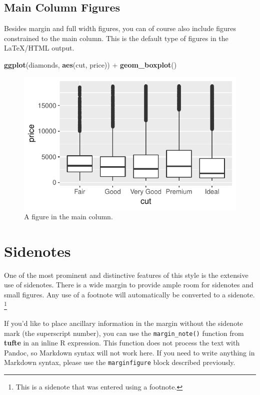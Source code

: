 \documentclass[]{tufte-handout}
\newenvironment{Shaded}{}{}
\newcommand{\KeywordTok}[1]{\textcolor[rgb]{0.00,0.44,0.13}{\textbf{#1}}}
\newcommand{\StringTok}[1]{\textcolor[rgb]{0.25,0.44,0.63}{#1}}
\newcommand{\OperatorTok}[1]{\textcolor[rgb]{0.40,0.40,0.40}{#1}}
\newcommand{\NormalTok}[1]{#1}
\begin{document}
\subsection{Main Column Figures}\label{main-column-figures}

Besides margin and full width figures, you can of course also include
figures constrained to the main column. This is the default type of
figures in the LaTeX/HTML output.

\begin{Shaded}
\begin{Highlighting}[]
\KeywordTok{ggplot}\NormalTok{(diamonds, }\KeywordTok{aes}\NormalTok{(cut, price)) }\OperatorTok{+}\StringTok{ }\KeywordTok{geom_boxplot}\NormalTok{()}
\end{Highlighting}
\end{Shaded}

\begin{figure}
\includegraphics{TufteExample_files/figure-latex/fig-main-1} \caption[A figure in the main column]{A figure in the main column.}\label{fig:fig-main}
\end{figure}

\section{Sidenotes}\label{sidenotes}

One of the most prominent and distinctive features of this style is the
extensive use of sidenotes. There is a wide margin to provide ample room
for sidenotes and small figures. Any use of a footnote will
automatically be converted to a sidenote. \footnote{This is a sidenote
  that was entered using a footnote.}

If you'd like to place ancillary information in the margin without the
sidenote mark (the superscript number), you can use the
\texttt{margin\_note()} function from \textbf{tufte} in an inline R
expression.
This function does not process the text with Pandoc, so Markdown syntax
will not work here. If you need to write anything in Markdown syntax,
please use the \texttt{marginfigure} block described previously.
\end{document}
